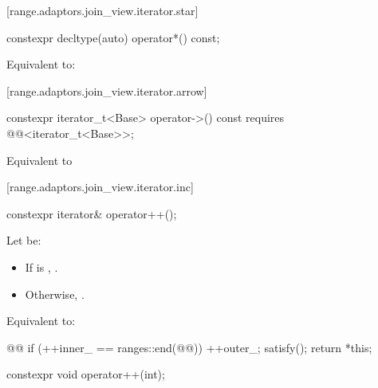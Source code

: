 \begin{addedblock}
[range.adaptors.join_view.iterator.star]{}

\begin{itemdecl}
constexpr decltype(auto) operator*() const;
\end{itemdecl}

\begin{itemdescr}
\pnum
\effects Equivalent to: 
\end{itemdescr}

[range.adaptors.join_view.iterator.arrow]{}

\begin{itemdecl}
constexpr iterator_t<Base> operator->() const
  requires @@<iterator_t<Base>>;
\end{itemdecl}

\begin{itemdescr}
\pnum
\effects Equivalent to 
\end{itemdescr}

[range.adaptors.join_view.iterator.inc]{}

\begin{itemdecl}
constexpr iterator& operator++();
\end{itemdecl}

\begin{itemdescr}
\pnum
Let  be:
\begin{itemize}
\item If  is , .
\item Otherwise, .
\end{itemize}

\pnum
\effects Equivalent to:
\begin{codeblock}
@@
if (++inner_ == ranges::end(@@)) {
  ++outer_;
  satisfy();
}
return *this;
\end{codeblock}
\end{itemdescr}

\begin{itemdecl}
constexpr void operator++(int);
\end{itemdecl}


\end{addedblock}
